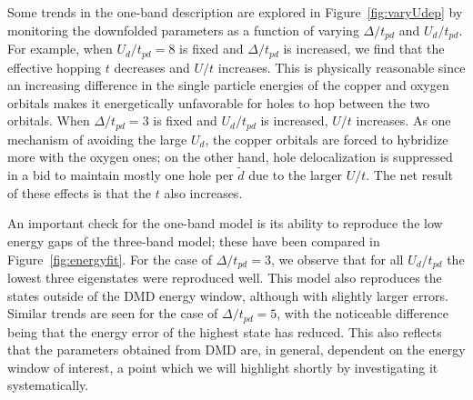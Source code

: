 \documentclass[aps, prb, 11pt]{revtex4-1}
\begin{document}
Some trends in the one-band description are explored in Figure~\ref{fig:varyUdep} 
by monitoring the downfolded parameters as a function of varying $\Delta/t_{pd}$ and $U_d/t_{pd}$. 
For example, when $U_d/t_{pd}=8$ is fixed and $\Delta/t_{pd}$ is increased, we find that 
the effective hopping $t$ decreases and $U/t$ increases. This is physically reasonable since an increasing difference in the 
single particle energies of the copper and oxygen orbitals makes it energetically unfavorable for holes 
to hop between the two orbitals. When $\Delta/t_{pd}=3$ is fixed and $U_d/t_{pd}$ is increased, $U/t$ increases. 
As one mechanism of avoiding the large $U_d$, the copper orbitals are forced to hybridize more with the oxygen ones; 
on the other hand, hole delocalization is suppressed in a bid to maintain mostly one hole per $\tilde{d}$ due to the larger 
$U/t$. The net result of these effects is that the $t$ also increases.%

An important check for the one-band model is its ability to reproduce the low energy gaps of the three-band model; these have been compared in Figure~\ref{fig:energyfit}. 
For the case of $\Delta/t_{pd}=3$, we observe that for all $U_d/t_{pd}$ the lowest three eigenstates were reproduced well. 
This model also reproduces the states outside of the DMD energy window, although with slightly larger errors. 
Similar trends are seen for the case of $\Delta/t_{pd}=5$, 
with the noticeable difference being that the energy error of the highest state has reduced. 
This also reflects that the parameters obtained from DMD are, in general, dependent on the energy window of interest, a 
point which we will highlight shortly by investigating it systematically. 
\end{document}
